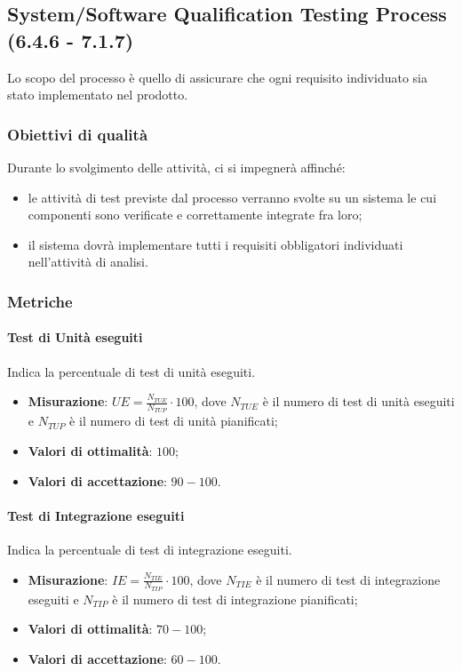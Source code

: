 \subsection{System/Software Qualification Testing Process (6.4.6 - 7.1.7)}
\label{sySoQualTest}
Lo scopo del processo è quello di assicurare che ogni requisito individuato sia stato implementato nel prodotto.
\subsubsection{Obiettivi di qualità}
Durante lo svolgimento delle attività, ci si impegnerà affinché:
\begin{itemize}
\item le attività di test previste dal processo verranno svolte su un sistema le cui componenti sono verificate e correttamente integrate fra loro;
\item il sistema dovrà implementare tutti i requisiti obbligatori individuati nell'attività di analisi.
\end{itemize}
\subsubsection{Metriche}
\paragraph{Test di Unità eseguiti}
\label{tuniese}
Indica la percentuale di test di unità eseguiti.
\begin{itemize}
\item \textbf{Misurazione}: $UE=\frac{N_{TUE}}{N_{TUP}} \cdot 100$, dove $N_{TUE}$ è il numero di test di unità eseguiti e $N_{TUP}$ è il numero di test di unità pianificati;
\item \textbf{Valori di ottimalità}: $100$;
\item \textbf{Valori di accettazione}: $90 - 100$.
\end{itemize}
\paragraph{Test di Integrazione eseguiti}
\label{tintese}
Indica la percentuale di test di integrazione eseguiti.
\begin{itemize}
\item \textbf{Misurazione}: $IE=\frac{N_{TIE}}{N_{TIP}} \cdot 100$, dove $N_{TIE}$ è il numero di test di integrazione eseguiti e $N_{TIP}$ è il numero di test di integrazione pianificati;
\item \textbf{Valori di ottimalità}: $70 - 100$;
\item \textbf{Valori di accettazione}: $60 - 100$.
\end{itemize}
